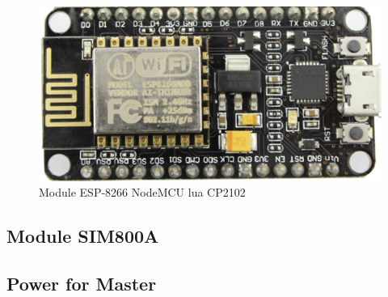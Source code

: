         \begin{figure}[!ht]
            \begin{center}
            \includegraphics[scale=0.9]{images/module-esp.png}
            \caption{Module ESP-8266 NodeMCU lua CP2102}
            \label{fig:moduleEsp}
            \end{center}
          \end{figure}

          \subsection{Module SIM800A}

          \subsection{Power for Master}


